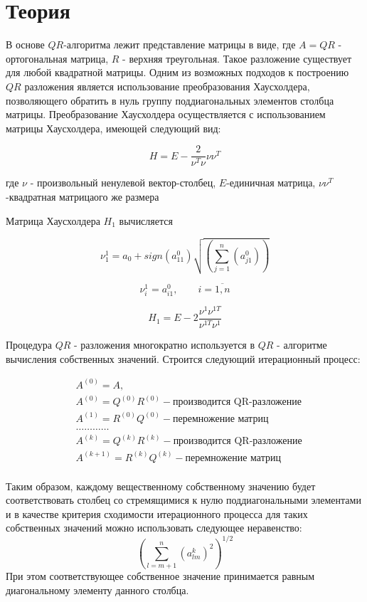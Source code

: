 \section*{Теория}

В основе $QR$-алгоритма лежит представление матрицы в виде, где $A = QR$ - ортогональная
матрица, $R$ - верхняя треугольная. Такое разложение существует для любой квадратной
матрицы. Одним из возможных подходов к построению $QR$ разложения является
использование преобразования Хаусхолдера, позволяющего обратить в нуль группу
поддиагональных элементов столбца матрицы. Преобразование Хаусхолдера осуществляется с
использованием матрицы Хаусхолдера, имеющей следующий вид:

$$H = E - \frac{2}{\nu^T\nu}\nu\nu^T$$

где $\nu$ - произвольный ненулевой вектор-столбец,
$E$-единичная матрица,
$\nu\nu^T$-квадратная матрицаого же размера

Матрица Хаусхолдера $H_1$ вычисляется

$$\nu^1_1 = a_0 + sign(a^0_{11})\sqrt{\left( \sum^{n}_{j=1}(a^{0}_{j1}) \right)}$$

$$\nu^1_i = a^0_{i1}, \qquad i = \overline{1,n}$$

$$H_1 = E - 2\frac{\nu^1\nu^{1T}}{\nu^{1T}\nu^1}$$

Процедура $QR$ - разложения многократно используется в $QR$ -
алгоритме вычисления собственных значений. Строится следующий итерационный процесс:

$$\begin{aligned}
    &A^{(0)} = A, \\
    &A^{(0)} = Q^{(0)}R^{(0)} - \text{производится QR-разложение}\\
    &A^{(1)} = R^{(0)}Q^{(0)} - \text{перемножение матриц}\\
    &\dots\dots\dots\dots\\
    &A^{(k)} = Q^{(k)}R^{(k)} - \text{производится QR-разложение}\\
    &A^{(k+1)} = R^{(k)}Q^{(k)} - \text{перемножение матриц}\\
\end{aligned}$$

Таким образом, каждому вещественному собственному значению будет соответствовать
столбец со стремящимися к нулю поддиагональными элементами и в качестве критерия
сходимости итерационного процесса для таких собственных значений можно использовать
следующее неравенство:
$$\left( \sum^{n}_{l=m+1}(a^{k}_{lm})^2\right)^{1/2}$$
При этом соответствующее собственное значение принимается
равным диагональному элементу данного столбца.

\pagebreak